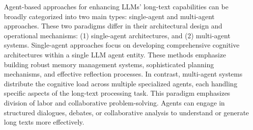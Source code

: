\documentclass[11pt, a4paper, logo, copyright, nonumbering]{map}
\begin{document}
Agent-based approaches for enhancing LLMs' long-text capabilities can be broadly categorized into two main types: single-agent and multi-agent approaches. These two paradigms differ in their architectural design and operational mechanisms: (1) single-agent architectures, and (2) multi-agent systems. Single-agent approaches focus on developing comprehensive cognitive architectures within a single LLM agent entity. These methods emphasize building robust memory management systems, sophisticated planning mechanisms, and effective reflection processes. In contrast, multi-agent systems distribute the cognitive load across multiple specialized agents, each handling specific aspects of the long-text processing task. This paradigm emphasizes division of labor and collaborative problem-solving. Agents can engage in structured dialogues, debates, or collaborative analysis to understand or generate long texts more effectively.
\end{document}
